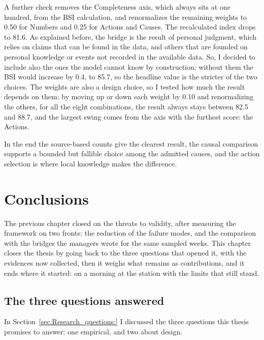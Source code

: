 \documentclass[12pt,a4paper,openright,twoside]{book}
\begin{document}
A further check removes the Completeness axis, which always sits at one hundred, from the \ac{BSI} calculation, and renormalizes the remaining weights to 0.50 for Numbers and 0.25 for Actions and Causes. The recalculated index drops to 81.6. 
As explained before, the bridge is the result of personal judgment, which relies on claims that can be found in the data, and others that are founded on personal knowledge or events not recorded in the available data.
So, I decided to include also the ones the model cannot know by construction; without them the \ac{BSI} would increase by 0.4, to 85.7, so the headline value is the stricter of the two choices.
The weights are also a design choice, so I tested how much the result depends on them: by moving up or down each weight by 0.10 and renormalizing the others, for all the eight combinations, the result always stays between 82.5 and 88.7, and the largest swing comes from the axis with the furthest score: the Actions.

In the end the source-based counts give the clearest result, the causal comparison supports a bounded but fallible choice among the admitted causes, and the action selection is where local knowledge makes the difference.
\chapter{Conclusions}
\label{chap:discussion}

The previous chapter closed on the threats to validity, after measuring the framework on two fronts: the reduction of the failure modes, and the comparison with the bridges the managers wrote for the same sampled weeks.
This chapter closes the thesis by going back to the three questions that opened it, with the evidences now collected, then it weighs what remains as contributions, and it ends where it started: on a morning at the station with the limits that still stand.

\section{The three questions answered}

In Section~\ref{sec:Research_questions:} I discussed the three questions this thesis promises to answer: one empirical, and two about design.
\end{document}
